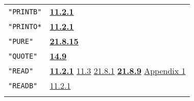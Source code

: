 \documentclass[a4paper]{scrbook}
\begin{document}
\begin{longtable}[]{@{}ll@{}}
\begin{minipage}[t]{0.24\columnwidth}
\texttt{"PRINTB"}\strut
\end{minipage} & \begin{minipage}[t]{0.70\columnwidth}\raggedright\strut
\textbf{\href{11-input-output.md\#1121-open}{11.2.1}}\strut
\end{minipage}\tabularnewline
\begin{minipage}[t]{0.24\columnwidth}\raggedright\strut
\texttt{"PRINTO*}\strut
\end{minipage} & \begin{minipage}[t]{0.70\columnwidth}\raggedright\strut
\textbf{\href{11-input-output.md\#1121-open}{11.2.1}}\strut
\end{minipage}\tabularnewline
\begin{minipage}[t]{0.24\columnwidth}\raggedright\strut
\texttt{"PURE"}\strut
\end{minipage} & \begin{minipage}[t]{0.70\columnwidth}\raggedright\strut
\textbf{\href{21-interrupts.md\#21815-dangerous-interrupts}{21.8.15}}\strut
\end{minipage}\tabularnewline
\begin{minipage}[t]{0.24\columnwidth}\raggedright\strut
\texttt{"QUOTE"}\strut
\end{minipage} & \begin{minipage}[t]{0.70\columnwidth}\raggedright\strut
\textbf{\href{14-data-type-declarations.md\#149-the-rsubr-decl}{14.9}}\strut
\end{minipage}\tabularnewline
\begin{minipage}[t]{0.24\columnwidth}\raggedright\strut
\texttt{"READ"}\strut
\end{minipage} & \begin{minipage}[t]{0.70\columnwidth}\raggedright\strut
\textbf{\href{11-input-output.md\#1121-open}{11.2.1}} \href{11-input-output.md\#113-end-of-file-routine}{11.3}
\href{21-interrupts.md\#2181-char-received}{21.8.1} \textbf{\href{21-interrupts.md\#2189-read-and-write}{21.8.9}}
\href{appendix-1-a-look-inside.md\#appendix-1-a-look-inside}{Appendix 1}\strut
\end{minipage}\tabularnewline
\begin{minipage}[t]{0.24\columnwidth}\raggedright\strut
\texttt{"READB"}\strut
\end{minipage} & \begin{minipage}[t]{0.70\columnwidth}\raggedright\strut
\href{11-input-output.md\#1121-open}{11.2.1}\strut
\end{minipage}\tabularnewline
\begin{minipage}[t]{0.24\columnwidth}\raggedright\strut

\end{minipage}
\end{longtable}
\end{document}
